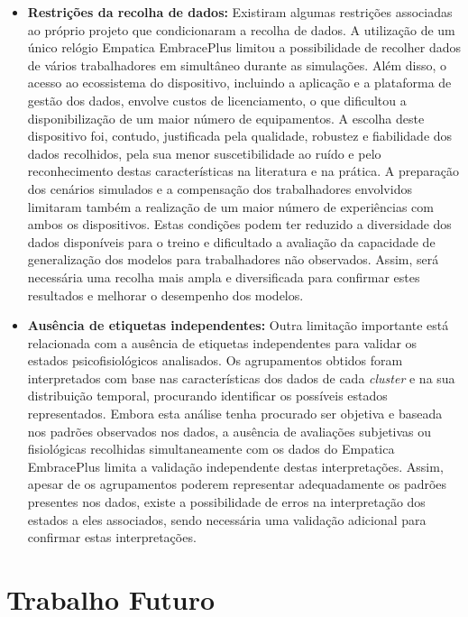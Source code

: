 \begin{itemize}
\item \textbf{Restrições da recolha de dados:} 
Existiram algumas restrições associadas ao próprio projeto que condicionaram a recolha de dados. A utilização de um único relógio Empatica EmbracePlus limitou a possibilidade de recolher dados de vários trabalhadores em simultâneo durante as simulações. Além disso, o acesso ao ecossistema do dispositivo, incluindo a aplicação e a plataforma de gestão dos dados, envolve custos de licenciamento, o que dificultou a disponibilização de um maior número de equipamentos. A escolha deste dispositivo foi, contudo, justificada pela qualidade, robustez e fiabilidade dos dados recolhidos, pela sua menor suscetibilidade ao ruído e pelo reconhecimento destas características na literatura e na prática. A preparação dos cenários simulados e a compensação dos trabalhadores envolvidos limitaram também a realização de um maior número de experiências com ambos os dispositivos. Estas condições podem ter reduzido a diversidade dos dados disponíveis para o treino e dificultado a avaliação da capacidade de generalização dos modelos para trabalhadores não observados. Assim, será necessária uma recolha mais ampla e diversificada para confirmar estes resultados e melhorar o desempenho dos modelos.

\item \textbf{Ausência de etiquetas independentes:} 
Outra limitação importante está relacionada com a ausência de etiquetas independentes para validar os estados psicofisiológicos analisados. Os agrupamentos obtidos foram interpretados com base nas características dos dados de cada \textit{cluster} e na sua distribuição temporal, procurando identificar os possíveis estados representados. Embora esta análise tenha procurado ser objetiva e baseada nos padrões observados nos dados, a ausência de avaliações subjetivas ou fisiológicas recolhidas simultaneamente com os dados do Empatica EmbracePlus limita a validação independente destas interpretações. Assim, apesar de os agrupamentos poderem representar adequadamente os padrões presentes nos dados, existe a possibilidade de erros na interpretação dos estados a eles associados, sendo necessária uma validação adicional para confirmar estas interpretações.
\end{itemize}

\section{Trabalho Futuro}
\label{sec:trabalho-futuro}

